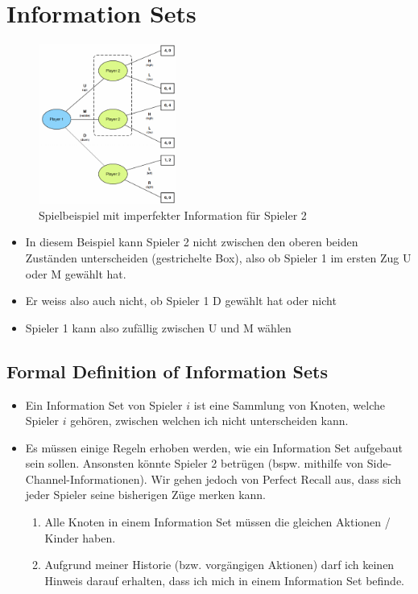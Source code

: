 \documentclass[a4paper]{article}
\begin{document}
	\newpage	
	
	\section{Information Sets}
	
	\begin{figure}[htb!]
		\centering
		\includegraphics[width=0.4\textwidth]{img/03_information_sets/information_sets.png}
		\caption{Spielbeispiel mit imperfekter Information für Spieler 2}
		\label{fig:03_infosets_information_sets}
	\end{figure}

	\begin{itemize}
		\item In diesem Beispiel kann Spieler 2 nicht zwischen den oberen beiden Zuständen unterscheiden (gestrichelte Box),
			also ob Spieler 1 im ersten Zug U oder M gewählt hat.
		\item Er weiss also auch nicht, ob Spieler 1 D gewählt hat oder nicht
		\item Spieler 1 kann also zufällig zwischen U und M wählen
	\end{itemize}

		\subsection{Formal Definition of Information Sets}
		
		\begin{itemize}
			\item Ein Information Set von Spieler $i$ ist eine Sammlung von Knoten, welche Spieler $i$ gehören, zwischen welchen ich nicht unterscheiden kann.
			\item Es müssen einige Regeln erhoben werden, wie ein Information Set aufgebaut sein sollen.
				Ansonsten könnte Spieler 2 betrügen (bspw. mithilfe von Side-Channel-Informationen).
				Wir gehen jedoch von Perfect Recall aus, dass sich jeder Spieler seine bisherigen Züge merken kann.
				\begin{enumerate}
					\item Alle Knoten in einem Information Set müssen die gleichen Aktionen / Kinder haben.
					\item Aufgrund meiner Historie (bzw. vorgängigen Aktionen) darf ich keinen Hinweis darauf erhalten, dass ich mich in einem Information Set befinde.
				\end{enumerate}
		\end{itemize}
	
\end{document}
